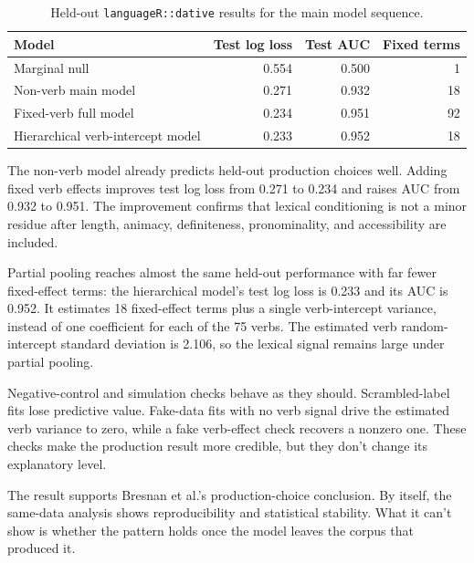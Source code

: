 \begin{table}[htbp]
\centering
\small
\begin{tabular}{lrrr}
\toprule
Model & Test log loss & Test AUC & Fixed terms \\
\midrule
Marginal null & 0.554 & 0.500 & 1 \\
Non-verb main model & 0.271 & 0.932 & 18 \\
Fixed-verb full model & 0.234 & 0.951 & 92 \\
Hierarchical verb-intercept model & 0.233 & 0.952 & 18 \\
\bottomrule
\end{tabular}
\caption{Held-out \texttt{languageR::dative} results for the main model sequence.}
\label{tab:languager-results}
\end{table}

The non-verb model already predicts held-out production choices well. Adding
fixed verb effects improves test log loss from 0.271 to 0.234 and raises AUC
from 0.932 to 0.951. The improvement confirms that lexical conditioning is %
not a minor residue after length, animacy, definiteness, pronominality, and
accessibility are included.

Partial pooling reaches almost the same held-out performance with far fewer
fixed-effect terms: the hierarchical model's test log loss is 0.233 and its AUC
is 0.952. It estimates 18 fixed-effect terms plus a single verb-intercept
variance, instead of one coefficient for each of the 75 verbs. The estimated verb
random-intercept standard deviation is 2.106, so the lexical signal remains
large under partial pooling.

Negative-control and simulation checks behave as they should.
Scrambled-label fits lose predictive value. Fake-data fits with no verb
signal drive the estimated verb variance to zero, while a fake verb-effect check
recovers a nonzero one. These checks
make the production result more credible, but they don't change its
explanatory level.

The result supports Bresnan et al.'s production-choice conclusion. By itself,
the same-data analysis shows reproducibility and statistical stability. What it
can't show is whether the pattern holds once the model leaves the corpus that
produced it.
